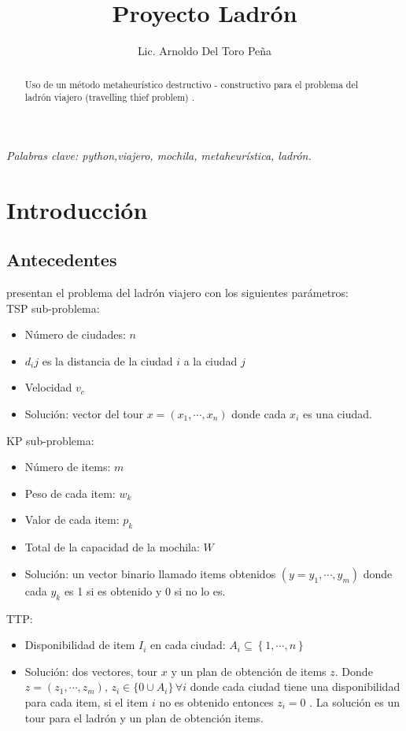 \documentclass{article}
\title{Proyecto Ladrón}
\author{Lic. Arnoldo Del Toro Peña}
\theoremstyle{mytheoremstyle}
\theoremstyle{mytheoremstyle}
\theoremstyle{myproblemstyle}
\begin{document}
    \maketitle
    
    \thispagestyle{empty}
    \begin{abstract}
    	Uso de un método metaheurístico destructivo - constructivo para el problema del ladrón viajero (travelling thief problem) \citep{bonyadi2013travelling}.
    \end{abstract}
    {\centering \textit{Palabras clave: python,viajero, mochila, metaheurística, ladrón.}}
    \section{Introducción}
    \subsection{Antecedentes}
    \citet{bonyadi2013travelling} presentan el problema del ladrón viajero con los siguientes parámetros: \\
    TSP sub-problema:
    \begin{itemize}
    	\item  Número de ciudades: $n$
    	\item $d_ij$ es la distancia de la ciudad $i$ a la ciudad $j$
    	\item Velocidad $v_c$
    	\item Solución: vector del tour $x = (x_1, \cdots, x_n)$ donde cada $x_i$ es una ciudad. 
    \end{itemize} 
    KP sub-problema:
    \begin{itemize}
    	\item Número de items: $m$
    	\item Peso de cada item: $w_k$
    	\item Valor de cada item: $p_k$
    	\item Total de la capacidad de la mochila: $W$
    	\item Solución: un vector binario llamado items obtenidos $(y = y_1, \cdots, y_m)$ donde cada $y_k$ es 1 si es obtenido y 0 si no lo es.
    \end{itemize}
	TTP:
	\begin{itemize}
		\item Disponibilidad de item $I_i$ en cada ciudad: $A_i \subseteq \left\{ 1, \cdots, n \right\}$
		\item Solución: dos vectores, tour $x$ y un plan de obtención de items $z$. Donde $z = (z_1, \cdots, z_m), \, z_i \in \{ 0 \cup A_i \} \, \forall i$ donde cada ciudad tiene una disponibilidad para cada item, si el item $i$ no es obtenido entonces $z_i = 0$ . La solución es un tour para el ladrón y un plan de obtención items. 
	\end{itemize}
\end{document}
